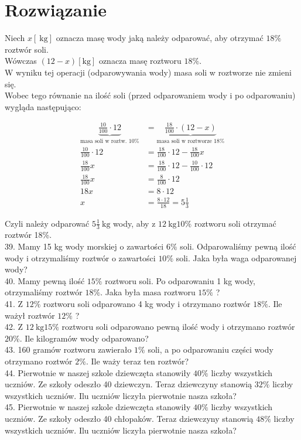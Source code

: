 \documentclass[10pt]{article}
\begin{document}
\section*{Rozwiązanie}
Niech \(x[\mathrm{~kg}]\) oznacza masę wody jaką należy odparować, aby otrzymać \(18 \%\) roztwór soli.\\
Wówczas \((12-x)[\mathrm{kg}]\) oznacza masę roztworu \(18 \%\).\\
W wyniku tej operacji (odparowywania wody) masa soli w roztworze nie zmieni się.\\
Wobec tego równanie na ilość soli (przed odparowaniem wody i po odparowaniu) wygląda następująco:

\[
\begin{aligned}
\underbrace{\frac{10}{100} \cdot 12}_{\text {masa soli w roztw. } 10 \%} & =\underbrace{\frac{18}{100} \cdot(12-x)}_{\text {masa soli w roztworze } 18 \%} \\
\frac{10}{100} \cdot 12 & =\frac{18}{100} \cdot 12-\frac{18}{100} x \\
\frac{18}{100} x & =\frac{18}{100} \cdot 12-\frac{10}{100} \cdot 12 \\
\frac{18}{100} x & =\frac{8}{100} \cdot 12 \\
18 x & =8 \cdot 12 \\
x & =\frac{8 \cdot 12}{18}=5 \frac{1}{3}
\end{aligned}
\]

Czyli należy odparować \(5 \frac{1}{3} \mathrm{~kg}\) wody, aby z \(12 \mathrm{~kg} 10 \%\) roztworu soli otrzymać roztwór 18\%.\\
39. Mamy 15 kg wody morskiej o zawartości \(6 \%\) soli. Odparowaliśmy pewną ilość wody i otrzymaliśmy roztwór o zawartości \(10 \%\) soli. Jaka była waga odparowanej wody?\\
40. Mamy pewną ilość \(15 \%\) roztworu soli. Po odparowaniu 1 kg wody, otrzymaliśmy roztwór \(18 \%\). Jaka była masa roztworu \(15 \%\) ?\\
41. Z \(12 \%\) roztworu soli odparowano 4 kg wody i otrzymano roztwór \(18 \%\). Ile ważył roztwór \(12 \%\) ?\\
42. Z \(12 \mathrm{~kg} 15 \%\) roztworu soli odparowano pewną ilość wody i otrzymano roztwór \(20 \%\). Ile kilogramów wody odparowano?\\
43. 160 gramów roztworu zawierało \(1 \%\) soli, a po odparowaniu części wody otrzymano roztwór \(2 \%\). Ile waży teraz ten roztwór?\\
44. Pierwotnie w naszej szkole dziewczęta stanowiły \(40 \%\) liczby wszystkich uczniów. Ze szkoły odeszło 40 dziewczyn. Teraz dziewczyny stanowią \(32 \%\) liczby wszystkich uczniów. Ilu uczniów liczyła pierwotnie nasza szkoła?\\
45. Pierwotnie w naszej szkole dziewczęta stanowiły \(40 \%\) liczby wszystkich uczniów. Ze szkoły odeszło 40 chłopaków. Teraz dziewczyny stanowią \(48 \%\) liczby wszystkich uczniów. Ilu uczniów liczyła pierwotnie nasza szkoła?
\end{document}
